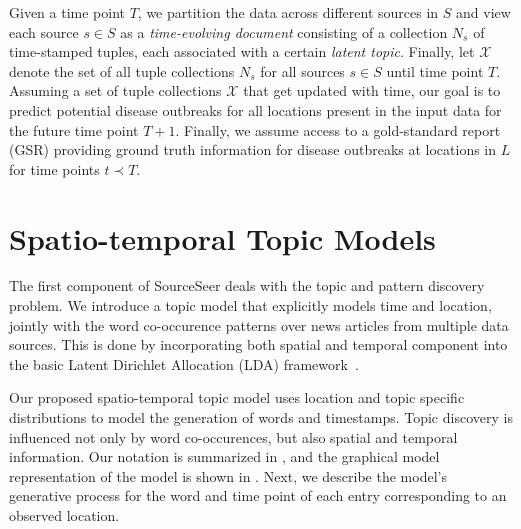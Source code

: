 \documentclass[twoside,leqno,twocolumn]{article}
\newcommand{\fullmodel}{{{\sf SourceSeer}}\xspace}
\begin{document}
Given a time point $T$, we partition the data across different sources in $S$ and view each source $s \in S$ as a {\em time-evolving document} consisting of a collection $N_s$ of time-stamped tuples, each associated with a certain {\em latent topic}. Finally, let $\mathcal{X}$ denote the set of all tuple collections $N_s$ for all sources $s \in S$ until time point $T$. Assuming a set of tuple collections $\mathcal{X}$ that get updated with time, our goal is to predict potential disease outbreaks for all locations present in the input data for the future time point $T+1$. Finally, we assume access to a gold-standard report (GSR) providing ground truth information for disease outbreaks at locations in $L$ for time points $t \prec T$. 

\vspace{-10pt}
\section{Spatio-temporal Topic Models}
\label{sec:model}
The first component of \fullmodel deals with the topic and pattern discovery problem.  We introduce a topic model that explicitly models time and location, jointly with the word co-occurence patterns over news articles from multiple data sources. This is done by incorporating both spatial and temporal component into the basic Latent Dirichlet Allocation (LDA) framework~\cite{blei:2003}.

Our proposed spatio-temporal topic model uses location and topic specific distributions to model the generation of words and timestamps. Topic discovery is influenced not only by word co-occurences, but also spatial and temporal information. Our notation is summarized in , and the graphical model representation of the model is shown in .  Next, we describe the model's generative process for the word and time point of each entry corresponding to an observed location.
\end{document}
